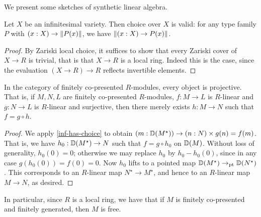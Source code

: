 We present some sketches of synthetic linear algebra.

\begin{lemma}\label{inf-has-choice}
Let $X$ be an infinitesimal variety. Then choice over $X$ is valid:
for any type family $P$ with $(x : X) \to \lVert P(x) \rVert$,
we have $\lVert (x : X) \to P(x) \rVert$.
\end{lemma}
\begin{proof}
By Zariski local choice, it suffices to show that every Zariski cover
of $X \to R$ is trivial, that is that $X \to R$ is a local ring.
Indeed this is the case, since the evaluation $(X \to R) \to R$
reflects invertible elements.
\end{proof}

\begin{lemma}
In the category of finitely co-presented $R$-modules, every object is projective.
That is, if $M,N,L$ are finitely co-presented $R$-modules,
$f : M \to L$ is $R$-linear and $g : N \to L$ is $R$-linear and surjective,
then there merely exists $h : M \to N$ such that $f = g \circ h$.
\end{lemma}
\begin{proof}
We apply \cref{inf-has-choice} to obtain
$(m : \mathbb{D}(M^\star)) \to (n : N) \times g(n) = f(m)$.
That is, we have $h_0 : \mathbb{D}(M^\star) \to N$ such that $f = g \circ h_0$ on $\mathbb{D}(M)$.
Without loss of generality, $h_0(0) = 0$; otherwise we may replace $h_0$
by $h_0 - h_0(0)$, since in any case $g(h_0(0)) = f(0) = 0$.
Now $h_0$ lifts to a pointed map $\mathbb{D}(M^\star) \to_{\mathrm{pt}} \mathbb{D}(N^\star)$.
This corresponds to an $R$-linear map $N^\star \to M^\star$, and hence to
an $R$-linear map $M \to N$, as desired.
\end{proof}

In particular, since $R$ is a local ring, we have that if $M$ is finitely co-presented and
finitely generated, then $M$ is free.
